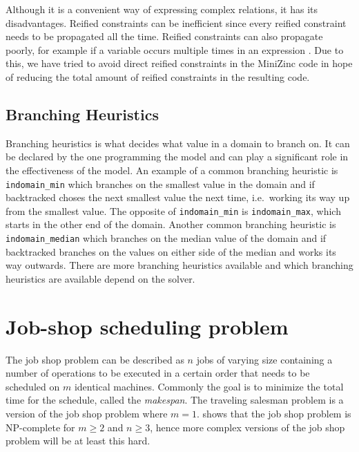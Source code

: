 Although it is a convenient way of expressing complex relations, it has its disadvantages. Reified constraints can be inefficient since every reified constraint needs to be propagated all the time. Reified constraints can also propagate poorly, for example if a variable occurs multiple times in an expression \cite{jefferson_2010}. Due to this, we have tried to avoid direct reified constraints in the MiniZinc code in hope of reducing the total amount of reified constraints in the resulting code.

\subsection{Branching Heuristics}
Branching heuristics is what decides what value in a domain to branch on. It can be declared by the one programming the model and can play a significant role in the effectiveness of the model. An example of a common branching heuristic is \texttt{indomain\_min} which branches on the smallest value in the domain and if backtracked choses the next smallest value the next time, i.e.\ working its way up from the smallest value. The opposite of \texttt{indomain\_min} is \texttt{indomain\_max}, which starts in the other end of the domain. Another common branching heuristic is \texttt{indomain\_median} which branches on the median value of the domain and if backtracked branches on the values on either side of the median and works its way outwards. There are more branching heuristics available and which branching heuristics are available depend on the solver.

\section{Job-shop scheduling problem}
The job shop problem can be described as $n$ jobs of varying size containing a number of operations to be executed in a certain order that needs to be scheduled on $m$ identical machines. Commonly the goal is to minimize the total time for the schedule, called the \emph{makespan}. The traveling salesman problem is a version of the job shop problem where $m = 1$. \cite{garey_1976} shows that the job shop problem is NP-complete for $m \geq 2$ and $n \geq 3$, hence more complex versions of the job shop problem will be at least this hard.

